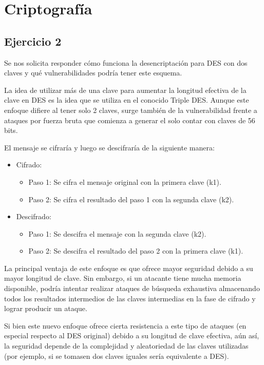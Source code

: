 \documentclass[11pt]{article}
\begin{document}
\section{Criptografía}

\subsection*{Ejercicio 2}
Se nos solicita responder cómo funciona la desencriptación para DES con dos claves y 
qué vulnerabilidades podría tener este esquema.

La idea de utilizar más de una clave para aumentar la longitud efectiva de la clave en DES es la idea 
que se utiliza en el conocido Triple DES. Aunque este enfoque difiere
al tener solo 2 claves, surge también de la vulnerabilidad frente a ataques por fuerza bruta 
que comienza a generar el solo contar con claves de 56 bits.

El mensaje se cifraría y luego se descifraría de la siguiente manera:

\begin{itemize}
\item Cifrado:

\begin{itemize}
\item Paso 1: Se cifra el mensaje original con la primera clave (k1).
\item Paso 2: Se cifra el resultado del paso 1 con la segunda clave (k2).
\end{itemize}

\item Descifrado:

\begin{itemize}
\item Paso 1: Se descifra el mensaje con la segunda clave (k2).
\item Paso 2: Se descifra el resultado del paso 2 con la primera clave (k1).
\end{itemize}

\end{itemize}

La principal ventaja de este enfoque es que ofrece mayor seguridad debido a su mayor longitud de clave. 
Sin embargo, si un atacante tiene mucha memoria disponible, podría intentar realizar ataques de búsqueda exhaustiva 
almacenando todos los resultados intermedios de las claves intermedias en la fase de cifrado y lograr producir un ataque.

Si bien este nuevo enfoque ofrece cierta resistencia a este tipo de ataques (en especial respecto al DES original)
debido a su longitud de clave efectiva, 
aún así, la seguridad depende de la complejidad y aleatoriedad de las claves utilizadas (por ejemplo, si
se tomasen dos claves iguales sería equivalente a DES).
\end{document}
